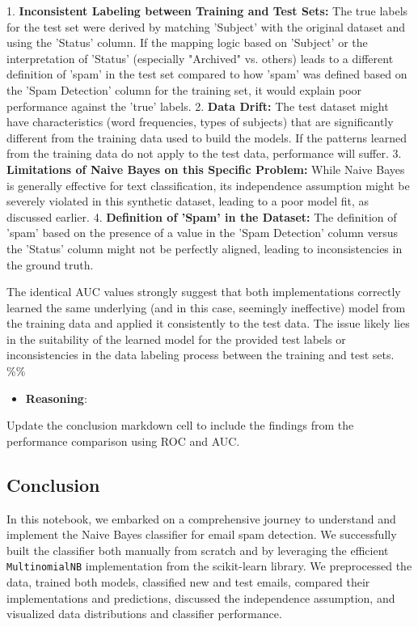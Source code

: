 \documentclass[12pt,a4paper]{article}
\begin{document}
1.  \textbf{Inconsistent Labeling between Training and Test Sets:} The true labels for the test set were derived by matching 'Subject' with the original dataset and using the 'Status' column. If the mapping logic based on 'Subject' or the interpretation of 'Status' (especially "Archived" vs. others) leads to a different definition of 'spam' in the test set compared to how 'spam' was defined based on the 'Spam Detection' column for the training set, it would explain poor performance against the 'true' labels.
2.  \textbf{Data Drift:} The test dataset might have characteristics (word frequencies, types of subjects) that are significantly different from the training data used to build the models. If the patterns learned from the training data do not apply to the test data, performance will suffer.
3.  \textbf{Limitations of Naive Bayes on this Specific Problem:} While Naive Bayes is generally effective for text classification, its independence assumption might be severely violated in this synthetic dataset, leading to a poor model fit, as discussed earlier.
4.  \textbf{Definition of 'Spam' in the Dataset:} The definition of 'spam' based on the presence of a value in the 'Spam Detection' column versus the 'Status' column might not be perfectly aligned, leading to inconsistencies in the ground truth.

The identical AUC values strongly suggest that both implementations correctly learned the same underlying (and in this case, seemingly ineffective) model from the training data and applied it consistently to the test data. The issue likely lies in the suitability of the learned model for the provided test labels or inconsistencies in the data labeling process between the training and test sets.
\%\%


\begin{itemize}
    \item \textbf{Reasoning}:
\end{itemize}

Update the conclusion markdown cell to include the findings from the performance comparison using ROC and AUC.



\subsection{Conclusion}

In this notebook, we embarked on a comprehensive journey to understand and implement the Naive Bayes classifier for email spam detection. We successfully built the classifier both manually from scratch and by leveraging the efficient \texttt{MultinomialNB} implementation from the scikit-learn library. We preprocessed the data, trained both models, classified new and test emails, compared their implementations and predictions, discussed the independence assumption, and visualized data distributions and classifier performance.
\end{document}
